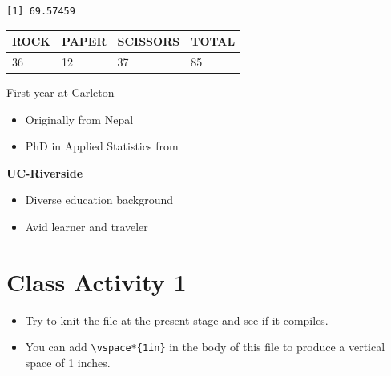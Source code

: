 \documentclass[
]{book}
\newenvironment{Shaded}{\begin{snugshade}}{\end{snugshade}}
\newcommand{\CommentTok}[1]{\textcolor[rgb]{0.56,0.35,0.01}{\textit{#1}}}
\newcommand{\FunctionTok}[1]{\textcolor[rgb]{0.00,0.00,0.00}{#1}}
\newcommand{\NormalTok}[1]{#1}
\newcommand{\OtherTok}[1]{\textcolor[rgb]{0.56,0.35,0.01}{#1}}
\newcommand{\SpecialCharTok}[1]{\textcolor[rgb]{0.00,0.00,0.00}{#1}}
\newcommand{\StringTok}[1]{\textcolor[rgb]{0.31,0.60,0.02}{#1}}
\providecommand{\tightlist}{%
  \setlength{\itemsep}{0pt}\setlength{\parskip}{0pt}}
\begin{document}
\begin{Shaded}
\end{Shaded}

\begin{verbatim}
[1] 69.57459
\end{verbatim}

\begin{longtable}[]{@{}llll@{}}
\toprule()
ROCK & PAPER & SCISSORS & TOTAL \\
\midrule()
\endhead
36 & 12 & 37 & 85 \\
\bottomrule()
\end{longtable}

First year at Carleton

\begin{itemize}
\tightlist
\item
  Originally from Nepal
\item
  PhD in Applied Statistics from
\end{itemize}

\textbf{UC-Riverside}

\begin{itemize}
\tightlist
\item
  Diverse education background
\item
  Avid learner and traveler
\end{itemize}

\hypertarget{class-activity-1}{%
\chapter{Class Activity 1}\label{class-activity-1}}

\begin{itemize}
\tightlist
\item
  Try to knit the file at the present stage and see if it compiles.
\item
  You can add \texttt{\textbackslash{}vspace*\{1in\}} in the body of this file to produce a vertical space of 1 inches.
\end{itemize}
\end{document}

